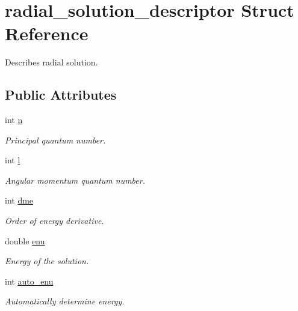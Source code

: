 \hypertarget{structradial__solution__descriptor}{}\section{radial\+\_\+solution\+\_\+descriptor Struct Reference}
\label{structradial__solution__descriptor}


Describes radial solution.  


\subsection*{Public Attributes}
\begin{DoxyCompactItemize}
\item 
int \hyperlink{structradial__solution__descriptor_ab0246e8a65be162caf9028b42741c8fd}{n}
\begin{DoxyCompactList}\small\item\em Principal quantum number. \end{DoxyCompactList}\item 
int \hyperlink{structradial__solution__descriptor_a006a1f6f6efe200121f1ff1168581828}{l}
\begin{DoxyCompactList}\small\item\em Angular momentum quantum number. \end{DoxyCompactList}\item 
int \hyperlink{structradial__solution__descriptor_ac07fb38838e782ab8bc1aaf169dd2b3b}{dme}
\begin{DoxyCompactList}\small\item\em Order of energy derivative. \end{DoxyCompactList}\item 
double \hyperlink{structradial__solution__descriptor_afa0bfaee751cd2b7e8c2e9ab001118c0}{enu}
\begin{DoxyCompactList}\small\item\em Energy of the solution. \end{DoxyCompactList}\item 
int \hyperlink{structradial__solution__descriptor_a4efb2665e4ab177682b288e992018526}{auto\+\_\+enu}
\begin{DoxyCompactList}\small\item\em Automatically determine energy. \end{DoxyCompactList}\end{DoxyCompactItemize}


